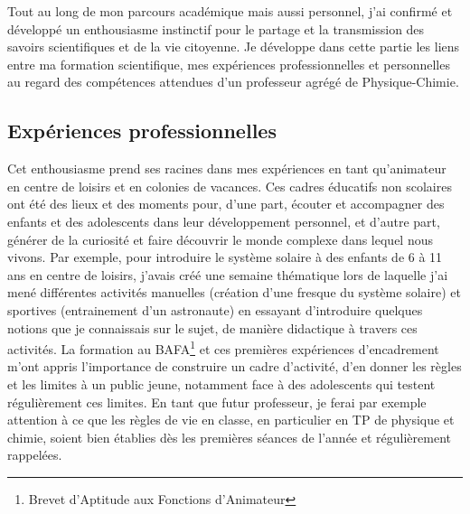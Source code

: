 \vspace{2mm}

Tout au long de mon parcours académique mais aussi personnel, j'ai confirmé et développé un enthousiasme instinctif pour le partage et la transmission des savoirs scientifiques et de la vie citoyenne. Je développe dans cette partie les liens entre ma formation scientifique, mes expériences professionnelles et personnelles au regard des compétences attendues d'un professeur agrégé de Physique-Chimie.
\subsection{Expériences professionnelles}
Cet enthousiasme prend ses racines dans mes expériences en tant qu'animateur en centre de loisirs et en colonies de vacances. Ces cadres éducatifs non scolaires ont été des lieux et des moments pour, d'une part, écouter et accompagner des enfants et des adolescents dans leur développement personnel, et d'autre part, générer de la curiosité et faire découvrir le monde complexe dans lequel nous vivons. Par exemple, pour introduire le système solaire à des enfants de 6 à 11 ans en centre de loisirs, j'avais créé une semaine thématique lors de laquelle j'ai mené différentes activités manuelles (création d'une fresque du système solaire) et sportives (entrainement d'un astronaute) en essayant d'introduire quelques notions que je connaissais sur le sujet, de manière didactique à travers ces activités. La formation au BAFA\footnote{Brevet d'Aptitude aux Fonctions d'Animateur} et ces premières expériences d'encadrement m'ont appris l'importance de construire un cadre d'activité, d'en donner les règles et les limites à un public jeune, notamment face à des adolescents qui testent régulièrement ces limites. En tant que futur professeur, je ferai par exemple attention à ce que les règles de vie en classe, en particulier en TP de physique et chimie, soient bien établies dès les premières séances de l'année et régulièrement rappelées. %
\\


